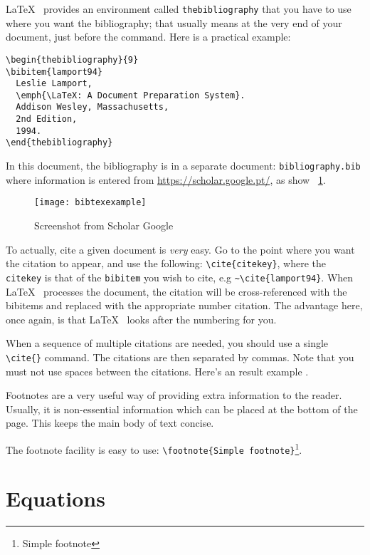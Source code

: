 \LaTeX~ provides an environment called \texttt{thebibliography} that you have to use where you want the bibliography; that usually means at the very end of your document, just before the \verb|| command. Here is a practical example:

\begin{verbatim}
\begin{thebibliography}{9}
\bibitem{lamport94}
  Leslie Lamport,
  \emph{\LaTeX: A Document Preparation System}.
  Addison Wesley, Massachusetts,
  2nd Edition,
  1994.
\end{thebibliography}
\end{verbatim}

In this document, the bibliography is in a separate document: \texttt{bi\-blio\-gra\-phy.bib}  where information is entered from \url{https://scholar.google.pt/}, as show  \figurename~\ref{fig:bibtex}.

\begin{figure}[ht]
	\centering
	\texttt{[image: bibtexexample]}
	  \caption{Screenshot from Scholar Google}
  \label{fig:bibtex}
\end{figure}

To actually, cite a given document is \textit{very} easy. Go to the point where you want the citation to appear, and use the following: \verb|\cite{citekey}|, where the \texttt{citekey} is that of the \texttt{bibitem} you wish to cite, e.g \verb|~\cite{lamport94}|.  When \LaTeX~ processes the document, the citation will be cross-referenced with the bibitems and replaced with the appropriate number citation. The advantage here, once again, is that \LaTeX~ looks after the numbering for you.

When a sequence of multiple citations are needed, you should use a single \verb|\cite{}| command. The citations are then separated by commas. Note that you must not use spaces between the citations. Here's an result example \cite{strunk,chicago,texbook}.

Footnotes are a very useful way of providing extra information to the reader. Usually, it is non-essential information which can be placed at the bottom of the page. This keeps the main body of text concise.

The footnote facility is easy to use: \verb|\footnote{Simple footnote}|\footnote{Simple footnote}. 

\section{Equations}

